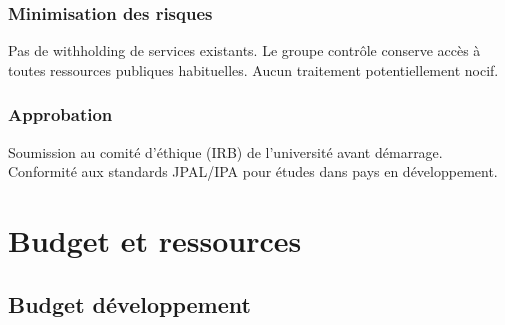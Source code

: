 \documentclass[12pt]{article}
\begin{document}
\subsubsection{Minimisation des risques}

Pas de withholding de services existants. Le groupe contrôle conserve accès à toutes ressources publiques habituelles. Aucun traitement potentiellement nocif.

\subsubsection{Approbation}

Soumission au comité d'éthique (IRB) de l'université avant démarrage. Conformité aux standards JPAL/IPA pour études dans pays en développement.

\section{Budget et ressources}

\subsection{Budget développement}
\end{document}
